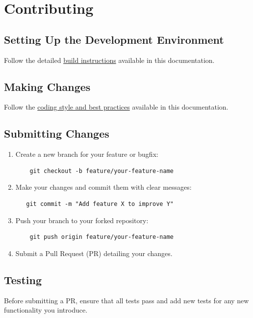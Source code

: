 \documentclass[12pt,a4paper]{article}
\begin{document}
\section{Contributing}

\subsection{Setting Up the Development Environment}

Follow the detailed \hyperref[build-instructions]{build instructions} available in this documentation.

\subsection{Making Changes}

Follow the \hyperref[coding-style]{coding style and best practices} available in this documentation.

\subsection{Submitting Changes}

\begin{enumerate}
    \item Create a new branch for your feature or bugfix:
\begin{verbatim}
    git checkout -b feature/your-feature-name
\end{verbatim}

    \item Make your changes and commit them with clear messages:
\begin{verbatim}
   git commit -m "Add feature X to improve Y"
\end{verbatim}

    \item Push your branch to your forked repository:
\begin{verbatim}
    git push origin feature/your-feature-name
\end{verbatim}

    \item Submit a Pull Request (PR) detailing your changes.
\end{enumerate}

\subsection{Testing}
Before submitting a PR, ensure that all tests pass and add new tests for any new functionality you introduce.
\end{document}
